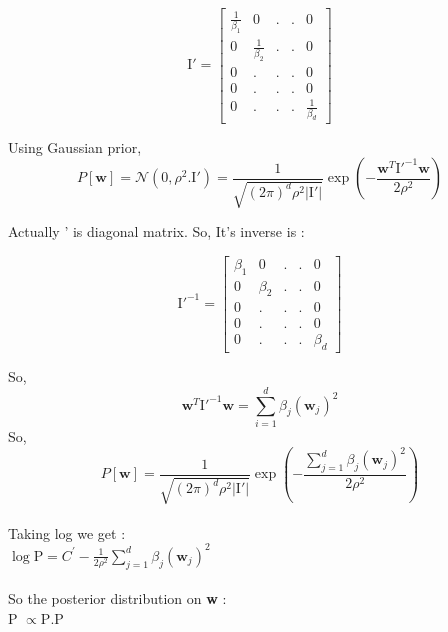 \documentclass[a4paper,11pt]{article}
\begin{document}
\begin{mlsolution}
\[ \text{I}{}' = \begin{bmatrix}
\frac{1}{\beta_{1}} & 0 & . & . & 0\\ 
0 & \frac{1}{\beta_{2}} & . & . & 0 \\ 
0 & . & . & . & 0\\ 
0 & . & . & . & 0\\ 
0 & . & . & . & \frac{1}{\beta_{d}}
\end{bmatrix}\]

Using Gaussian prior, 
\[
P[\textbf{w}] = \mathcal{N}\left ( 0, \rho^{2}.\text{I}{}' \right ) = \frac{1}{\sqrt{\left ( 2\pi \right)^{d}\rho^{2}\left | \text{I}{}' \right |}}\exp\left ( - \frac{\textbf{w}^T\text{I}{}'^{-1}\textbf{w}}{2\rho^{2}} \right )
\]

Actually ' is diagonal matrix. So, It's inverse is :

\[
    \text{I}{}'^{-1} = \begin{bmatrix}
\beta_{1} & 0 & . & . & 0\\ 
0 & \beta_{2} & . & . & 0 \\ 
0 & . & . & . & 0\\ 
0 & . & . & . & 0\\ 
0 & . & . & . & \beta_{d}
\end{bmatrix}
\]

So, 
\[
\textbf{w}^T\text{I}{}'^{-1}\textbf{w} = \sum_{i=1}^{d}   \beta_j \left ( \textbf{w}_{j} \right )^{2}
\]
So, 
\[
P[\textbf{w}] = \frac{1}{\sqrt{\left ( 2\pi \right)^{d}\rho^{2}\left | \text{I}{}' \right |}}\exp\left ( - \frac{\sum_{j = 1}^{d} \beta_{j}\left ( \textbf{w}_{j} \right )^{2} }{2\rho^{2}} \right )
\]
\\Taking log we get :\\

\begin{math}
\log \end{math}\;P\begin{math}[\textbf{w}]  = C^{'} - \frac{1}{2\rho^{2}} \sum_{j = 1}^{d} \beta_{j}\left ( \textbf{w}_{j} \right )^{2} 
\end{math}\\\\So the posterior distribution on \textbf{w} :\\

P \begin{math}[\textbf{w}\mid\textbf{X},\textbf{y}]  \propto \end{math}\;P\begin{math}[\textbf{y}|\textbf{X}, \textbf{w}] . \end{math}\;P\begin{math}[\textbf{w}]\end{math}\\


\end{mlsolution}
\end{document}
